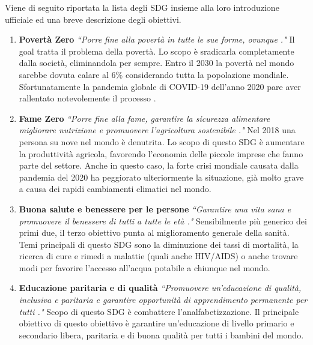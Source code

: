 \noindent Viene di seguito riportata la lista degli SDG insieme alla loro introduzione ufficiale ed una breve descrizione degli obiettivi.
\begin{enumerate}
\item \textbf{Povertà Zero}\newline
\textit{``Porre fine alla povertà in tutte le sue forme, ovunque \cite{goals}."}\newline
Il goal tratta il problema della povertà. Lo scopo è sradicarla completamente dalla società, eliminandola per sempre. Entro il 2030 la povertà nel mondo sarebbe dovuta calare al 6\% considerando tutta la popolazione mondiale. Sfortunatamente la pandemia globale di COVID-19 dell'anno 2020 pare aver rallentato notevolemente il processo \cite{reportONU}.
\item \textbf{Fame Zero}\newline
\textit{``Porre fine alla fame, garantire la sicurezza alimentare migliorare nutrizione e promuovere l’agricoltura sostenibile \cite{goals}."}\newline
Nel 2018 una persona su nove nel mondo è denutrita. \cite{stateOfFood}\newline
Lo scopo di questo SDG è aumentare la produttività agricola, favorendo l'economia delle piccole imprese che fanno parte del settore. Anche in questo caso, la forte crisi mondiale causata dalla pandemia del 2020 ha peggiorato ulteriormente la situazione, già molto grave a causa dei rapidi cambiamenti climatici nel mondo.
\item \textbf{Buona salute e benessere per le persone}\newline
\textit{``Garantire una vita sana e promuovere il benessere di tutti a tutte le età \cite{goals}."}\newline
Sensibilmente più generico dei primi due, il terzo obiettivo punta al miglioramento generale della sanità. Temi principali di questo SDG sono la diminuzione dei tassi di mortalità, la ricerca di cure e rimedi a malattie (quali anche HIV/AIDS) o anche trovare modi per favorire l'accesso all'acqua potabile a chiunque nel mondo.
\item \textbf{Educazione paritaria e di qualità}\newline
\textit{``Promuovere un'educazione di qualità, inclusiva e paritaria e garantire opportunità di apprendimento permanente per tutti \cite{goals}."}\newline
Scopo di questo SDG è combattere l'analfabetizzazione.\newline
Il principale obiettivo di questo obiettivo è garantire un'educazione di livello primario e secondario libera, paritaria e di buona qualità per tutti i bambini del mondo.

\end{enumerate}
